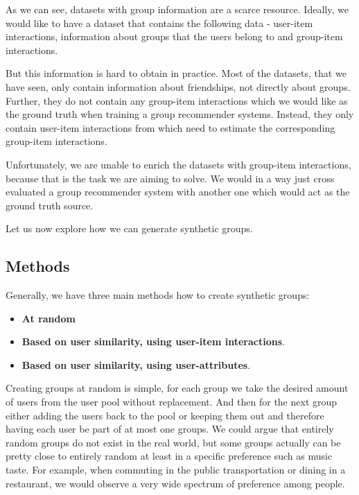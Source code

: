 As we can see, datasets with group information are a scarce resource. Ideally, we would like to have a dataset that contains the following data - user-item interactions, information about groups that the users belong to and group-item interactions.

But this information is hard to obtain in practice. Most of the datasets, that we have seen, only contain information about friendships, not directly about groups. Further, they do not contain any group-item interactions which we would like as the ground truth when training a group recommender systems. Instead, they only contain user-item interactions from which need to estimate the corresponding group-item interactions.

Unfortunately, we are unable to enrich the datasets with group-item interactions, because that is the task we are aiming to solve. We would in a way just cross evaluated a group recommender system with another one which would act as the ground truth source.

Let us now explore how we can generate synthetic groups.

\subsection{Methods}

Generally, we have three main methods how to create synthetic groups:
\begin{itemize}
    \item \textbf{At random}
    \item \textbf{Based on user similarity, using user-item interactions}.
    \item \textbf{Based on user similarity, using user-attributes}.
\end{itemize}

Creating groups at random is simple, for each group we take the desired amount of users from the user pool without replacement. And then for the next group either adding the users back to the pool or keeping them out and therefore having each user be part of at most one groups. We could argue that entirely random groups do not exist in the real world, but some groups actually can be pretty close to entirely random at least in a specific preference such as music taste. For example, when commuting in the public transportation or dining in a restaurant, we would observe a very wide spectrum of preference among people.

